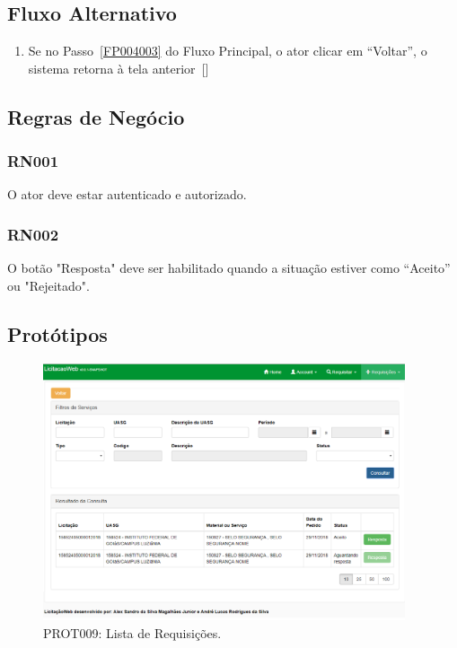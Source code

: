 \begin{anexosenv}
\subsection*{Fluxo Alternativo}
\begin{enumerate}
    \item Se no Passo~\ref{FP004003} do Fluxo Principal, o ator clicar em ``Voltar'', o sistema retorna à tela anterior~[]
\end{enumerate}

\subsection*{Regras de Negócio}

\subsubsection*{RN001}\label{rn014}
O ator deve estar autenticado e autorizado.

\subsubsection*{RN002}\label{rn013}
O botão "Resposta" deve ser habilitado quando a situação estiver como “Aceito” ou "Rejeitado".

\subsection*{Protótipos}
\begin{figure}[htbp]
    \centering
    \includegraphics[width=0.95\textwidth]{figuras/prototipo009.png}
    \caption[PROT009: Lista de Requisições]{PROT009: Lista de Requisições.}
    \label{PROT009}
\end{figure}


\end{anexosenv}
